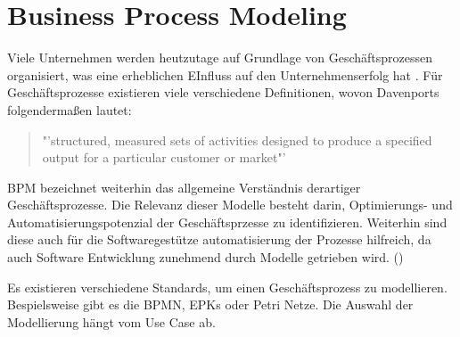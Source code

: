 \section{Business Process Modeling}
Viele Unternehmen werden heutzutage auf Grundlage von Geschäftsprozessen organisiert, was eine erheblichen EInfluss auf den Unternehmenserfolg hat . Für  Geschäftsprozesse existieren viele verschiedene Definitionen, wovon Davenports folgendermaßen lautet: 
\begin{quote}
"'structured, measured sets of activities designed to produce a specified output for a particular customer or market"'
\end{quote} \ac{BPM} bezeichnet weiterhin das allgemeine Verständnis derartiger Geschäftsprozesse. Die Relevanz dieser Modelle besteht darin, Optimierungs- und Automatisierungspotenzial der Geschäftsprzesse zu identifizieren. Weiterhin sind diese auch für die Softwaregestütze automatisierung der Prozesse hilfreich, da auch Software Entwicklung zunehmend durch Modelle getrieben wird. (\cite[vgl.][74]{BPM})\par
Es existieren verschiedene Standards, um einen Geschäftsprozess zu modellieren. Bespielsweise gibt es die \ac{BPMN}, EPKs oder Petri Netze. Die Auswahl der Modellierung hängt vom Use Case ab.